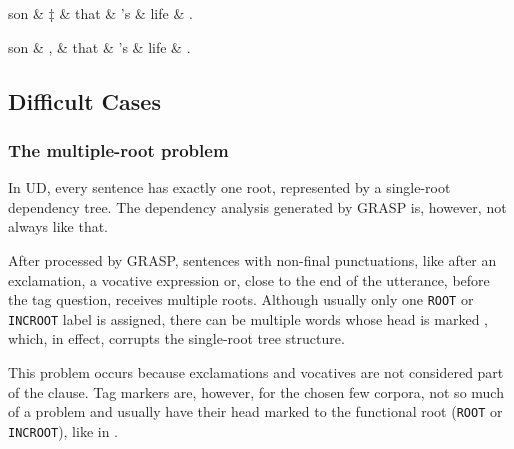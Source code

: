 \begin{minipage}{\widefigurewidth}
\begin{dependency}[edge slant=3pt]
    \begin{deptext}[column sep=0.7cm]
    son \& ‡ \& that \& 's \& life \& .\\
    \end{deptext}
\end{dependency}
\hfill
\begin{dependency}[edge slant=3pt]
    \begin{deptext}[column sep=0.7cm]
    son \& , \& that \& 's \& life \& .\\
    \end{deptext}
\end{dependency}
\end{minipage}
\label{fig:voc}

\subsection{Difficult Cases}\label{sec:grdifficult}
\subsubsection{The multiple-root problem}
In UD, every sentence has exactly one root, represented by a single-root dependency tree. The dependency analysis generated by GRASP is, however, not always like that.

After processed by GRASP, sentences with non-final punctuations, like after an exclamation, a vocative expression or, close to the end of the utterance, before the tag question, receives multiple roots. Although usually only one \texttt{ROOT} or \texttt{INCROOT} label is assigned, there can be multiple words whose head is marked , which, in effect, corrupts the single-root tree structure.

This problem occurs because exclamations and vocatives are not considered part of the clause. Tag markers are, however, for the chosen few corpora, not so much of a problem and usually have their head marked to the functional root (\texttt{ROOT} or \texttt{INCROOT}), like in .

